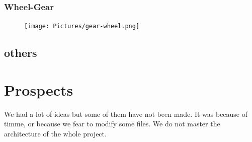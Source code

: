 \documentclass{article}
\begin{document}
\subsubsection*{Wheel-Gear}
\begin{figure}[H]
   \texttt{[image: Pictures/gear-wheel.png]}
\end{figure}

\subsection*{others} %
\section*{Prospects}
We had a lot of ideas but some of them have not been made. It was because of timme, or because we fear to modify some files. We do not master the architecture of the whole project. 
\end{document}
